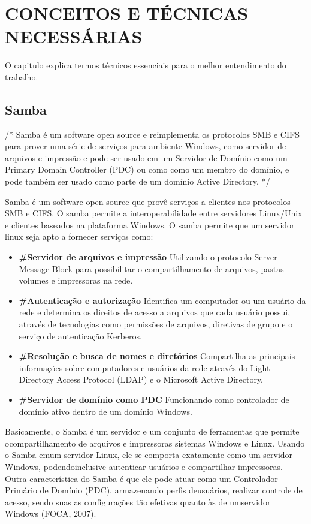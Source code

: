 \chapter{CONCEITOS E TÉCNICAS NECESSÁRIAS}

O capitulo explica termos técnicos essenciais para o melhor entendimento do trabalho.

\section{Samba}

/* Samba é um software open source e reimplementa os protocolos SMB e CIFS para prover
uma série de serviços para ambiente Windows, como servidor de arquivos e impressão e pode
ser usado em um Servidor de Domínio como um Primary Domain Controller (PDC) ou como
como um membro do domínio, e pode também ser usado como parte de um domínio Active
Directory. */

Samba é um software open source que provê serviços a clientes nos protocolos SMB e CIFS.
O samba permite a interoperabilidade entre servidores Linux/Unix e clientes baseados na
plataforma Windows.
O samba permite que um servidor linux seja apto a fornecer serviços como:
  \begin{itemize}
    \item \textbf{\#Servidor de arquivos e impressão} Utilizando o protocolo Server Message Block para possibilitar o compartilhamento de arquivos, pastas volumes e impressoras na rede.

    \item \textbf{\#Autenticação e autorização} Identifica um computador ou um usuário da rede e determina os direitos de acesso a arquivos que cada usuário possui, através de tecnologias como permissões de arquivos, diretivas de grupo e o serviço de autenticação Kerberos.

    \item \textbf{\#Resolução e busca de nomes e diretórios} Compartilha as principais informações sobre computadores e usuários da rede através do Light Directory Access Protocol (LDAP) e o Microsoft Active Directory.

    \item \textbf{\#Servidor de domínio como PDC} Funcionando como controlador de domínio ativo dentro de um domínio Windows.
  \end{itemize}

Basicamente, o Samba é um servidor e um conjunto de ferramentas que permite ocompartilhamento de arquivos e impressoras sistemas Windows e Linux. Usando o Samba emum servidor Linux, ele se comporta exatamente como um servidor Windows, podendoinclusive autenticar usuários e compartilhar impressoras. Outra característica do Samba é que ele pode atuar como um Controlador Primário de Domínio (PDC), armazenando perfis deusuários, realizar controle de acesso, sendo suas as configurações tão efetivas quanto às de umservidor Windows (FOCA, 2007).

